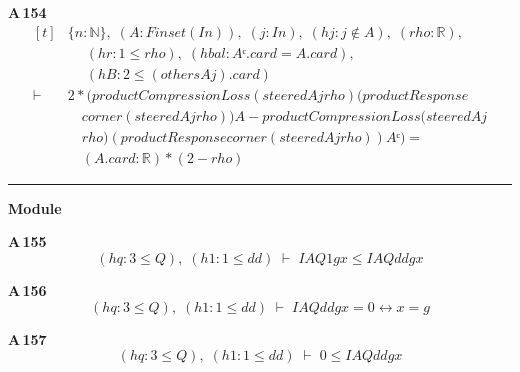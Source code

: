 \noindent\textbf{A\,154}\quad{}
{\footnotesize\[ \begin{aligned}[t]
&\{ \mathit{n} : \mathbb{N} \},\; (\mathit{A} : \mathit{Finset} (\mathit{I} \mathit{n})),\; (\mathit{j} : \mathit{I} \mathit{n}),\; (\mathit{hj} : \mathit{j} \notin \mathit{A}),\; (\mathit{rho} : \mathbb{R} ),\\
&\quad \; (\mathit{hr} : 1 \leq \mathit{rho}),\; (\mathit{hbal} : \mathit{Aᶜ}.\mathit{card}=\mathit{A}.\mathit{card}),\\
&\quad \; (\mathit{hB} : 2 \leq (\mathit{others} \mathit{A} \mathit{j}).\mathit{card})\\
\vdash\;&2*(\mathit{productCompressionLoss} (\mathit{steered} \mathit{A} \mathit{j} \mathit{rho}) (\mathit{productResponse}\\
&\quad \mathit{corner} (\mathit{steered} \mathit{A} \mathit{j} \mathit{rho})) \mathit{A}- \mathit{productCompressionLoss} (\mathit{steered} \mathit{A} \mathit{j}\\
&\quad \mathit{rho}) (\mathit{productResponse} \mathit{corner} (\mathit{steered} \mathit{A} \mathit{j} \mathit{rho})) \mathit{Aᶜ})=\\
&\quad (\mathit{A}.\mathit{card}:\mathbb{R} )*(2-\mathit{rho})
\end{aligned} \]}

\vspace{4pt}\noindent\rule{\columnwidth}{0.4pt}\par\vspace{2pt}
\noindent\textbf{Module }\par\vspace{3pt}

\noindent\textbf{A\,155}\quad{}
{\footnotesize\[ (\mathit{hq} : 3 \leq \mathit{Q}),\; (\mathit{h1} : 1 \leq \mathit{dd}) \;\vdash\; \mathit{IA} \mathit{Q} 1 \mathit{g} \mathit{x} \leq \mathit{IA} \mathit{Q} \mathit{dd} \mathit{g} \mathit{x} \]}

\noindent\textbf{A\,156}\quad{}
{\footnotesize\[ (\mathit{hq} : 3 \leq \mathit{Q}),\; (\mathit{h1} : 1 \leq \mathit{dd}) \;\vdash\; \mathit{IA} \mathit{Q} \mathit{dd} \mathit{g} \mathit{x} = 0 \leftrightarrow \mathit{x} = \mathit{g} \]}

\noindent\textbf{A\,157}\quad{}
{\footnotesize\[ (\mathit{hq} : 3 \leq \mathit{Q}),\; (\mathit{h1} : 1 \leq \mathit{dd}) \;\vdash\; 0 \leq \mathit{IA} \mathit{Q} \mathit{dd} \mathit{g} \mathit{x} \]}

